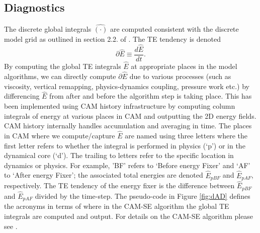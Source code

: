 \documentclass{agujournal}
\newcommand*{\gi}[1]{\widehat{#1}}
\begin{document}
\subsection{Diagnostics}\label{sec:diagnostics}
The discrete global integrals $\gi{(\cdot)}$ are computed consistent with the discrete model grid as outlined in section 2.2. of \citet{LBDL2014JAMES}. The TE tendency is denoted
\begin{equation}
\partial \gi{E}\equiv \frac{d\gi{E}}{dt}.
\end{equation}
By computing the global TE integrals $\gi{E}$ at appropriate places in the model algorithms, we can directly compute $\partial \gi{E}$ due to various processes (such as viscosity, vertical remapping, physics-dynamics coupling, pressure work etc.) by differencing $\gi{E}$ from after and before the algorithm step is taking place. This has been implemented using CAM history infrastructure by computing column integrals of energy at various places in CAM and outputting the 2D energy fields. CAM history internally handles accumulation and averaging in time. The places in CAM where we compute/capture $\gi{E}$ are named using three letters where the first letter refers to whether the integral is performed in physics (`p') or in the dynamical core (`d'). The trailing to letters refer to the specific location in dynamics or physics. For example, 'BF' refers to `Before energy Fixer' and `AF' to `After energy Fixer'; the associated total energies are denoted $\gi{E}_{pBF}$ and $\gi{E}_{pAF}$, respectively. The TE tendency of the energy fixer is the difference between $\gi{E}_{pBF}$ and $\gi{E}_{pAF}$ divided by the time-step. The pseudo-code in Figure \ref{fig:dAD} defines the acronyms in terms of where in the CAM-SE algorithm the global TE integrals are computed and output. For details on the CAM-SE algorithm please see \citet{LetAl2018JAMES}.
\end{document}
